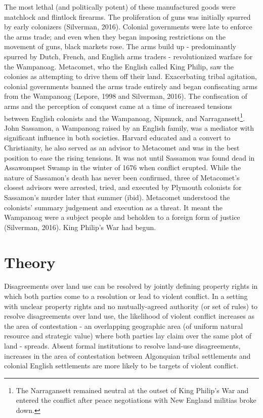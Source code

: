\documentclass[11pt]{article}
\begin{document}
The most lethal (and politically potent) of these manufactured goods were matchlock and flintlock firearms. The proliferation of guns was initially spurred by early colonizers (Silverman, 2016). Colonial governments were late to enforce the arms trade; and even when they began imposing restrictions on the movement of guns, black markets rose. The arms build up - predominantly spurred by Dutch, French, and English arms traders - revolutionized warfare for the Wampanoag. Metacomet, who the English called King Philip, saw the colonies as attempting to drive them off their land. Exacerbating tribal agitation, colonial governments banned the arms trade entirely and began confiscating arms from the Wampanoag (Lepore, 1998 and Silverman, 2016). The confiscation of arms and the perception of conquest came at a time of increased tensions between English colonists and the Wampanoag, Nipmuck, and Narragansett\footnote{The Narragansett remained neutral at the outset of King Philip's War and entered the conflict after peace negotiations with New England militias broke down.}. John Sassamon, a Wampanoag raised by an English family, was a mediator with significant influence in both societies. Harvard educated and a convert to Christianity, he also served as an advisor to Metacomet and was in the best position to ease the rising tensions. It was not until Sassamon was found dead in Assawompset Swamp in the winter of 1676 when conflict erupted. While the nature of Sassamon's death has never been confirmed, three of Metacomet's closest advisors were arrested, tried, and executed by Plymouth colonists for Sassamon's murder later that summer (ibid). Metacomet understood the colonists' summary judgement and execution as a threat. It meant the Wampanoag were a subject people and beholden to a foreign form of justice (Silverman, 2016). King Philip's War had begun.



\section{Theory}

Disagreements over land use can be resolved by jointly defining property rights in which both parties come to a resolution or lead to violent conflict. In a setting with unclear property rights and no mutually-agreed authority (or set of rules) to resolve disagreements over land use, the likelihood of violent conflict increases as the area of contestation - an overlapping geographic area (of uniform natural resource and strategic value) where both parties lay claim over the same plot of land - spreads. Absent formal institutions to resolve land-use disagreements, increases in the area of contestation between Algonquian tribal settlements and colonial English settlements are more likely to be targets of violent conflict.
\end{document}
